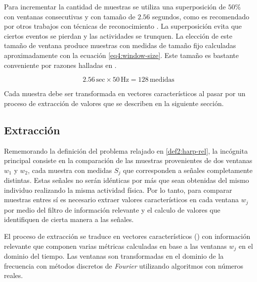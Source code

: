 Para incrementar la cantidad de muestras se utiliza una superposición
de $50\%$ con ventanas consecutivas y con tamaño de $2.56$ segundos,
como es recomendado por otros trabajos con técnicas de reconocimiento
\cite{Bao2004,ReyesOrtiz2015}. La superposición evita que ciertos
eventos se pierdan y las actividades se trunquen. La elección de este
tamaño de ventana produce muestras con medidas de tamaño fijo calculadas
aproximadamente con la ecuación \ref{eq4:window-size}. Este tamaño
es bastante conveniente por razones halladas en \cite{ReyesOrtiz2015}.

\begin{equation}
2.56\,\mathrm{sec}\times50\mathrm{\,Hz}=128\,\mathrm{medidas}\label{eq4:window-size}
\end{equation}

Cada muestra debe ser transformada en vectores característicos al
pasar por un proceso de extracción de valores que se describen en
la siguiente sección.

\subsection{Extracción}

\label{ssec44:extraction}Rememorando la definición del problema relajado
en \ref{def2:harp-rel}, la incógnita principal consiste en la comparación
de las muestras provenientes de dos ventanas $w_{1}$ y $w_{2}$,
cada muestra con medidas $S_{j}$ que corresponden a señales completamente
distintas. Estas señales no serán idénticas por más que sean obtenidas
del mismo individuo realizando la misma actividad física. Por lo tanto,
para comparar muestras entres sí es necesario extraer valores característicos
en cada ventana $w_{j}$ por medio del filtro de información relevante
y el calculo de valores que identifiquen de cierta manera a las señales. 

El proceso de extracción se traduce en vectores característicos ()
con información relevante que componen varias métricas calculadas
en base a las ventanas $w_{j}$ en el dominio del tiempo. Las ventanas
son transformadas en el dominio de la frecuencia con métodos discretos
de\emph{ Fourier} utilizando algoritmos  con números reales. 

